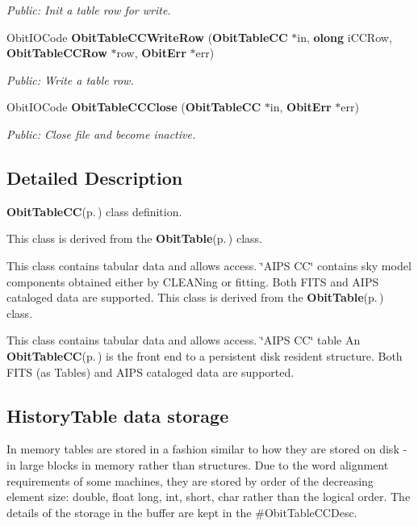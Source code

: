 \begin{CompactItemize}
\begin{CompactList}\small\item\em Public: Init a table row for write. \item\end{CompactList}\item 
Obit\-IOCode {\bf Obit\-Table\-CCWrite\-Row} ({\bf Obit\-Table\-CC} $\ast$in, {\bf olong} i\-CCRow, {\bf Obit\-Table\-CCRow} $\ast$row, {\bf Obit\-Err} $\ast$err)
\begin{CompactList}\small\item\em Public: Write a table row. \item\end{CompactList}\item 
Obit\-IOCode {\bf Obit\-Table\-CCClose} ({\bf Obit\-Table\-CC} $\ast$in, {\bf Obit\-Err} $\ast$err)
\begin{CompactList}\small\item\em Public: Close file and become inactive. \item\end{CompactList}\end{CompactItemize}


\subsection{Detailed Description}
{\bf Obit\-Table\-CC}{\rm (p.\,\pageref{structObitTableCC})} class definition. 

This class is derived from the {\bf Obit\-Table}{\rm (p.\,\pageref{structObitTable})} class.

This class contains tabular data and allows access. \char`\"{}AIPS CC\char`\"{} contains sky model components obtained either by CLEANing or fitting. Both FITS and AIPS cataloged data are supported. This class is derived from the {\bf Obit\-Table}{\rm (p.\,\pageref{structObitTable})} class.

This class contains tabular data and allows access. \char`\"{}AIPS CC\char`\"{} table An {\bf Obit\-Table\-CC}{\rm (p.\,\pageref{structObitTableCC})} is the front end to a persistent disk resident structure. Both FITS (as Tables) and AIPS cataloged data are supported.\subsection{History\-Table data storage}\label{ObitTableWX_8h_TableDataStorage}
In memory tables are stored in a fashion similar to how they are stored on disk - in large blocks in memory rather than structures. Due to the word alignment requirements of some machines, they are stored by order of the decreasing element size: double, float long, int, short, char rather than the logical order. The details of the storage in the buffer are kept in the \#Obit\-Table\-CCDesc.

